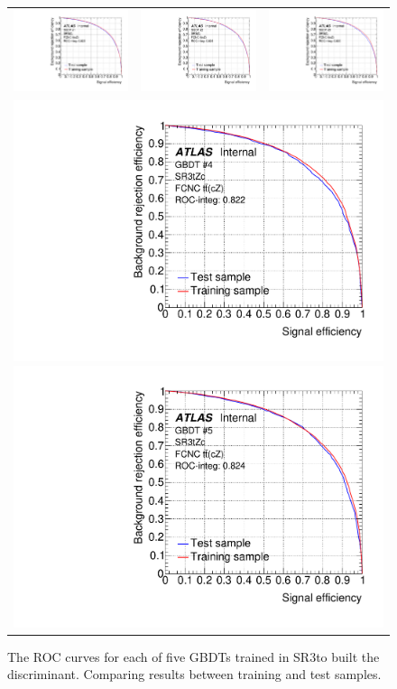 \begin{figure}[htbp]
	\centering
	\begin{tabular}{ccc}
		\includegraphics[width=.3\textwidth]{Chapters/CH6/figures/SR3_UsingSMT/BDT/ROC_Fold1} &
		\includegraphics[width=.3\textwidth]{Chapters/CH6/figures/SR3_UsingSMT/BDT/ROC_Fold2} &
		\includegraphics[width=.3\textwidth]{Chapters/CH6/figures/SR3_UsingSMT/BDT/ROC_Fold3} \\ 
		\multicolumn{3}{c}{
			\includegraphics[width=.3\textwidth]{Chapters/CH6/figures/SR3_UsingSMT/BDT/ROC_Fold4}
			\includegraphics[width=.3\textwidth]{Chapters/CH6/figures/SR3_UsingSMT/BDT/ROC_Fold5}} \\
	\end{tabular}
	\caption{ The ROC curves for each of five GBDTs trained in SR3\tZc to built the \Dthree discriminant. 
		Comparing results between training and test samples.
	}%
	\label{fig:separation:SR3:ROC}
\end{figure}

